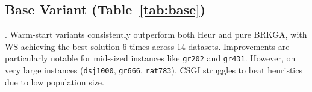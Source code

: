 \documentclass[sigconf]{acmart}
\begin{document}





\subsection{Base Variant (Table~\ref{tab:base})}. 
Warm-start variants consistently outperform both Heur and pure BRKGA, with WS achieving the best solution 6 times across 14 datasets. Improvements are particularly notable for mid-sized instances like \texttt{gr202} and \texttt{gr431}. However, on very large instances (\texttt{dsj1000}, \texttt{gr666}, \texttt{rat783}), CSGI struggles to beat heuristics due to low population size. 
\end{document}
